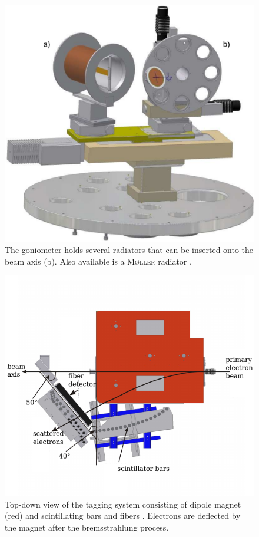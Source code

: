 \begin{minipage}[htbp]{.45\linewidth}
	\begin{figure}[H]
		\centering
		\includegraphics[width=\linewidth]{figs/goni-ganz.pdf}
		\caption{The goniometer holds several radiators that can be inserted onto the beam axis (b). Also available is a \textsc{M\o ller} radiator \cite{cb}.\\}
		\label{fig:goni}
	\end{figure}
\end{minipage}
\hfill
\begin{minipage}[htbp]{.49\linewidth}
\begin{figure}[H]
	\centering
	\includegraphics[width=\linewidth]{figs/Tagger.pdf}
	\caption{Top-down view of the tagging system consisting of dipole magnet (red) and scintillating bars and fibers \cite{tagger}. Electrons are deflected by the magnet after the bremsstrahlung process.}
	\label{fig:tagger}
\end{figure}
\end{minipage}
